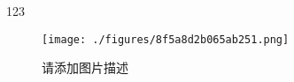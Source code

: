 
123

\begin{figure}[ht]
\centering
\texttt{[image: ./figures/8f5a8d2b065ab251.png]}
\caption{请添加图片描述} \label{fig_test31_1}
\end{figure}
